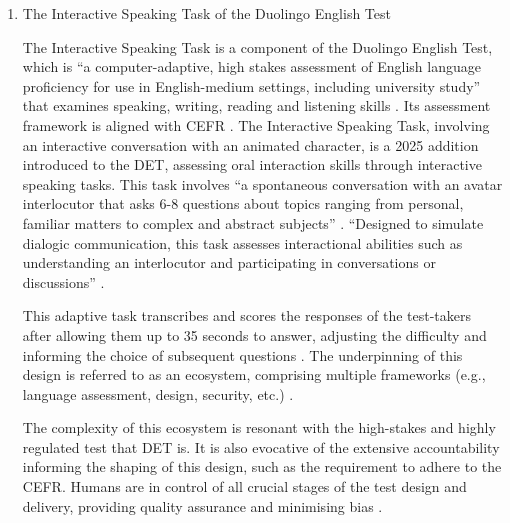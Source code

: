 \documentclass[english]{textolivre}
\begin{document}
\begin{enumerate}[label=\Alph*.]
The third example from the Duolingo app analysed () comes from ‘Explain My Answer’, an in-lesson AI-assisted feedback feature within the main path for practising languages. This shows yet another approach to using AI in the language learning design. The AI identifies the user’s mistakes and provides explanations, elaborating on the language pattern or rule a user may find challenging \cite{castillo2026explain}.

\item The Interactive Speaking Task of the Duolingo English Test

The Interactive Speaking Task is a component of the Duolingo English Test, which is “a computer-adaptive, high stakes assessment of English language proficiency for use in English-medium settings, including university study” that examines speaking, writing, reading and listening skills \cite[p. 1]{kostromitina2025evolution}. Its assessment framework is aligned with CEFR \cite{burstein2022theoretical}. The Interactive Speaking Task, involving an interactive conversation with an animated character, is a 2025 addition introduced to the DET, assessing oral interaction skills through interactive speaking tasks. This task involves “a spontaneous conversation with an avatar interlocutor that asks 6-8 questions about topics ranging from personal, familiar matters to complex and abstract subjects” \cite[p. 3]{park2025assessing}. “Designed to simulate dialogic communication, this task assesses interactional abilities such as understanding an interlocutor and participating in conversations or discussions” \cite[p. 4]{park2025assessing}.

This adaptive task transcribes and scores the responses of the test-takers after allowing them up to 35 seconds to answer, adjusting the difficulty and informing the choice of subsequent questions \cite{park2025assessing,wodzak2025interactive}. The underpinning of this design is referred to as an ecosystem, comprising multiple frameworks (e.g., language assessment, design, security, etc.) \cite{burstein2022theoretical}.

The complexity of this ecosystem is resonant with the high-stakes and highly regulated test that DET is. It is also evocative of the extensive accountability informing the shaping of this design, such as the requirement to adhere to the CEFR. Humans are in control of all crucial stages of the test design and delivery, providing quality assurance and minimising bias \cite{burstein2022theoretical}.


\end{enumerate}
\end{document}
